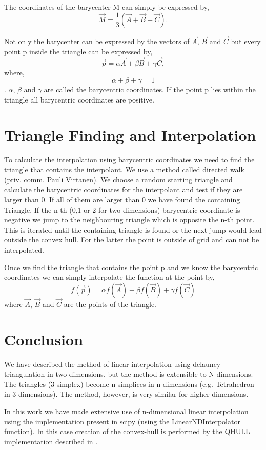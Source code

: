 The coordinates of the barycenter M can simply be expressed by,
\[
\vec{M} = \frac{1}{3} (\vec{A} + \vec{B} + \vec{C}).
\]

Not only the barycenter can be expressed by the vectors of $\vec{A}$, $\vec{B}$ and $\vec{C}$ but every point p inside the triangle can be expressed by,
\[
\vec{p} = \alpha\vec{A} + \beta\vec{B} + \gamma\vec{C},
\]
where,
\[
\alpha + \beta + \gamma = 1
\]
. $\alpha$, $\beta$ and $\gamma$ are called the barycentric coordinates. If the point p lies within the triangle all barycentric coordinates are positive. 

\section{Triangle Finding and Interpolation}

To calculate the interpolation using barycentric coordinates we need to find the triangle that contains the interpolant. We use a method called directed walk (priv. comm. Pauli Virtanen). We choose a random starting triangle and calculate the barycentric coordinates for the interpolant and test if they are larger than 0. If all of them are larger than 0 we have found the containing Triangle. 
If the n-th (0,1 or 2 for two dimensions) barycentric coordinate is negative we jump to the neighbouring triangle which is opposite the n-th point. This is iterated until the containing triangle is found or the next jump would lead outside the convex hull. For the latter the point is outside of grid and can not be interpolated.

Once we find the triangle that contains the point p and we know the barycentric coordinates we can simply interpolate the function at the point by,
\[
f(\vec{p})=\alpha f(\vec{A}) + \beta f(\vec{B}) + \gamma f(\vec{C})
\]
where  $\vec{A}$, $\vec{B}$ and $\vec{C}$ are the points of the triangle. 


\section{Conclusion}

We have described the method of linear interpolation using delauney triangulation in two dimensions, but the method is extensible to N-dimensions. The triangles (3-simplex) become n-simplices in n-dimensions (e.g. Tetrahedron in 3 dimensions). The method, however, is very similar for higher dimensions. 

In this work we have made extensive use of n-dimensional linear interpolation using the implementation present in scipy \citescipy (using the LinearNDInterpolator function). In this case creation of the convex-hull is performed by the QHULL implementation described in \citet{Barber96thequickhull}.

